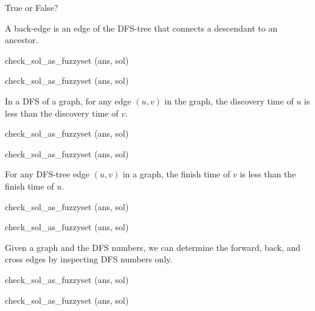 \begin{problem}[DFS]
True or False? 

\asktf[a)]
A back-edge is an edge of the DFS-tree that connects a descendant to
an ancestor.
\solf

\algoc
check_sol_as_fuzzyset (ans, sol)

\algog
check_sol_as_fuzzyset (ans, sol)


\asktf[b)] 

In a DFS of a graph, for any edge $(u,v)$ in the graph, the discovery
time of $u$ is less than the discovery time of $v$.  

\solf

\algoc
check_sol_as_fuzzyset (ans, sol)

\algog
check_sol_as_fuzzyset (ans, sol)
 


\asktf[c)]
For any DFS-tree edge $(u,v)$ in a graph, the finish time of $v$ is
less than the finish time of $u$.  
\solt

\algoc
check_sol_as_fuzzyset (ans, sol)

\algog
check_sol_as_fuzzyset (ans, sol)


\asktf[d)] 
Given a graph and the DFS numbers, we can determine the
forward, back, and cross edges by inspecting DFS numbers only.  
\solt

\algoc
check_sol_as_fuzzyset (ans, sol)

\algog
check_sol_as_fuzzyset (ans, sol)






 

\end{problem}


